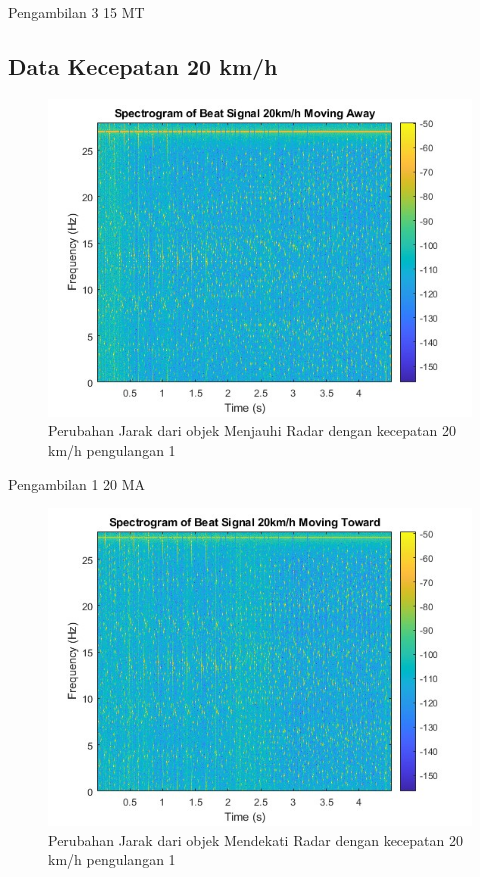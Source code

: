 Pengambilan 3 15 MT

\subsection{Data Kecepatan 20 km/h}

\begin{figure}
	\centering
	\includegraphics[scale=0.6]{pics/bab5/Velocity/1_20MA.jpg}
	\caption{Perubahan Jarak dari objek Menjauhi Radar dengan kecepatan 20 km/h pengulangan 1}
	\label{fig:pengambilan1_20MA}
\end{figure}

Pengambilan 1 20 MA

\begin{figure}
	\centering
	\includegraphics[scale=0.6]{pics/bab5/Velocity/1_20MT.jpg}
	\caption{Perubahan Jarak dari objek Mendekati Radar dengan kecepatan 20 km/h pengulangan 1}
	\label{fig:pengambilan1_20MT}
\end{figure}

